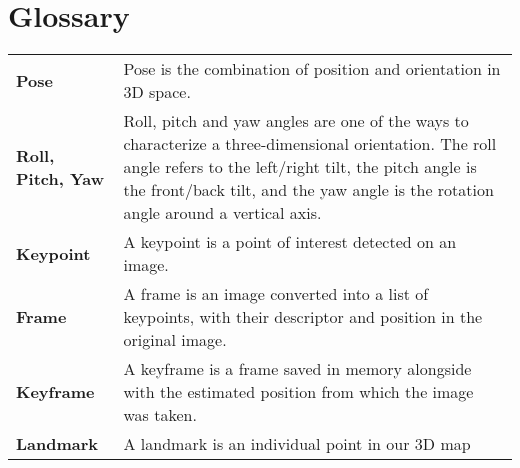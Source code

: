 \chapter*{Glossary}

\begin{tabular}{lp{123mm}}
\bf{Pose}              & Pose is the combination of position and orientation in 3D space.\vspace{5mm}\\
\bf{Roll, Pitch, Yaw}  & Roll, pitch and yaw angles are one of the ways to characterize a three-dimensional orientation. The roll angle refers to the left/right tilt, the pitch angle is the front/back tilt, and the yaw angle is the rotation angle around a vertical axis.\vspace{5mm}\\
\bf{Keypoint}          & A keypoint is a point of interest detected on an image.\vspace{5mm}\\
\bf{Frame}             & A frame is an image converted into a list of keypoints, with their descriptor and position in the original image.\vspace{5mm}\\
\bf{Keyframe}          & A keyframe is a frame saved in memory alongside with the estimated position from which the image was taken.\vspace{5mm}\\
\bf{Landmark}          & A landmark is an individual point in our 3D map
\end{tabular}